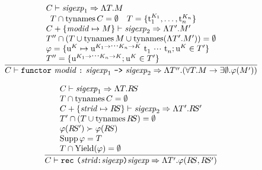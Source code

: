 \begin{equation}		%
\label{trfunsigexp-rule}
\frac{\begin{array}{l}
      \C\ts\sigexp_1\ra\sig{\T}{\M} \\
      \begin{array}{lr}
      \T \cap \TyNamesFcn \C = \emptyset & 
      \T = \{\t[\K_1]_1,\ldots,\t[\K_{n}]_n\}
      \end{array}\\
      \C+\{\modid\mapsto\M\}\ts\sigexp_2\ra\sig{\T'}{\M'} \\
      \T'' \cap (\T \cup \TyNamesFcn M \cup \TyNamesFcn (\sig{\T'}{\M'}))
           = \emptyset \\
      \tyrea = \{ \u[\K] \mapsto
                    \u[\Karr{\K_1}{\cdots\Karr{\K_n}{\K}}]\ \t_1\ \cdots\ \t_n;
                  \u[\K] \in \T'\} \\
      \T'' = \{\u[\Karr{\K_1}{\cdots\Karr{\K_n}{\K}}];  \u[\K] \in \T'\}
      \end{array}
     }
     {\C\ts\trfunsigexp\ra\sig{\T''}{(\fun{\T}{\M}{\exmod{\emptyset}{\tyrea(\M')})}}}
\end{equation}

\begin{equation}		%
\label{opfunsigexp-rule}
\frac{\begin{array}{l}
      \C\ts\sigexp_1\ra\sig{\T}{\RS} \\
      \T \cap \TyNamesFcn \C = \emptyset  \\
      \C+\{\strid\mapsto\RS\}\ts\sigexp_2\ra\sig{\T'}{\RS'} \\
      \T' \cap (\T \cup \TyNamesFcn \RS) = \emptyset  \\
      \tyrea(\RS') \succ \tyrea(\RS) \\
      \Supp \tyrea = \T \\
      \T \cap \Yield(\tyrea) = \emptyset\\
     \end{array}
     }
     {\C\ts\recsigexp\ra{\sig{\T'}{\tyrea{\recstr{{\RS}}{\RS'}}}}}
\end{equation}

